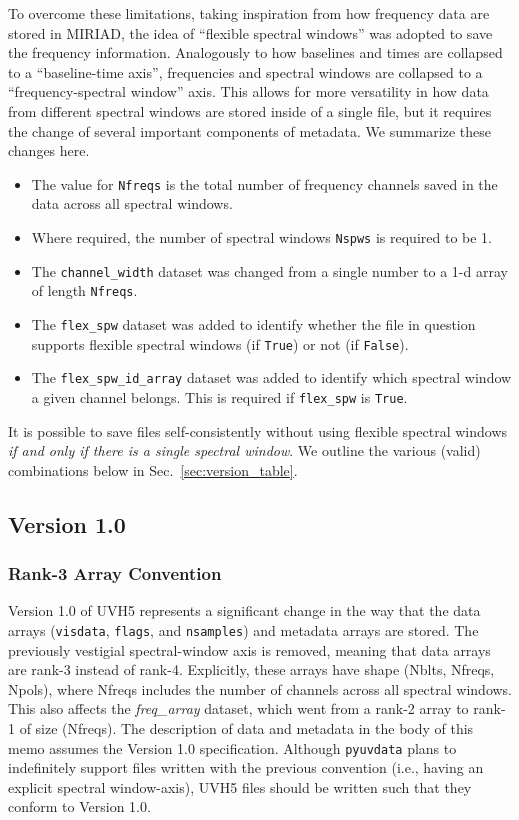 \documentclass[11pt, oneside]{article}
\begin{document}
To overcome these limitations, taking inspiration from how frequency data are
stored in MIRIAD, the idea of ``flexible spectral windows'' was adopted to save
the frequency information. Analogously to how baselines and times are collapsed
to a ``baseline-time axis'', frequencies and spectral windows are collapsed to a
``frequency-spectral window'' axis. This allows for more versatility in how data
from different spectral windows are stored inside of a single file, but it
requires the change of several important components of metadata. We summarize
these changes here.
\begin{itemize}
\item The value for \verb+Nfreqs+ is the total number of frequency channels
  saved in the data across all spectral windows.
\item Where required, the number of spectral windows \verb+Nspws+ is required to
  be 1.
\item The \verb+channel_width+ dataset was changed from a single number to a 1-d
  array of length \verb+Nfreqs+.
\item The \verb+flex_spw+ dataset was added to identify whether the file in
  question supports flexible spectral windows (if \verb+True+) or not (if
  \verb+False+).
\item The \verb+flex_spw_id_array+ dataset was added to identify which spectral
  window a given channel belongs. This is required if \texttt{flex\_spw} is
  \texttt{True}.
\end{itemize}

It is possible to save files self-consistently without using flexible spectral
windows \textit{if and only if there is a single spectral window}. We outline
the various (valid) combinations below in Sec.~\ref{sec:version_table}.


\subsection{Version 1.0}

\subsubsection{Rank-3 Array Convention}
\label{sec:rank3_arrays}
Version 1.0 of UVH5 represents a significant change in the way that the data
arrays (\verb+visdata+, \verb+flags+, and \verb+nsamples+) and metadata arrays
are stored. The previously vestigial spectral-window axis is removed, meaning
that data arrays are rank-3 instead of rank-4. Explicitly, these arrays have
shape (Nblts, Nfreqs, Npols), where Nfreqs includes the number of channels
across all spectral windows. This also affects the \textit{freq\_array} dataset,
which went from a rank-2 array to rank-1 of size (Nfreqs). The description of
data and metadata in the body of this memo assumes the Version 1.0
specification. Although \verb+pyuvdata+ plans to indefinitely support files
written with the previous convention (i.e., having an explicit spectral
window-axis), UVH5 files should be written such that they conform to Version
1.0.
\end{document}
